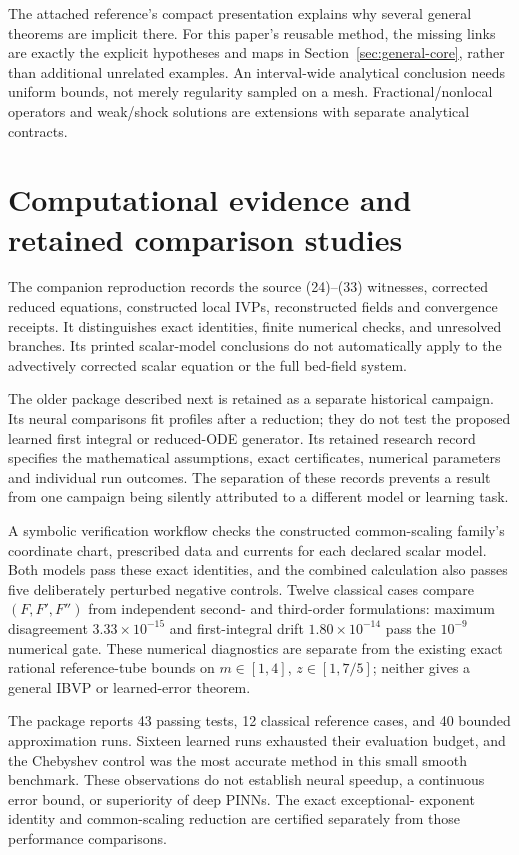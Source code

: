 \documentclass[11pt]{article}
\theoremstyle{definition}
\begin{document}
The attached reference's compact presentation explains why several general
theorems are implicit there. For this paper's reusable method, the missing
links are exactly the explicit hypotheses and maps in
Section~\ref{sec:general-core}, rather than additional unrelated examples.
An interval-wide analytical conclusion needs uniform bounds, not merely
regularity sampled on a mesh. Fractional/nonlocal operators and weak/shock
solutions are extensions with separate analytical contracts.

\section{Computational evidence and retained comparison studies}
\label{sec:experiment-artifact}
The companion reproduction records the source
(24)--(33) witnesses, corrected reduced equations, constructed local IVPs,
reconstructed fields and convergence receipts. It distinguishes exact
identities, finite numerical checks, and unresolved branches. Its printed
scalar-model conclusions do not automatically apply to the advectively
corrected scalar equation or the full bed-field system.

The older package described next is retained as a separate historical
campaign. Its neural comparisons fit profiles after a reduction; they do not
test the proposed learned first integral or reduced-ODE generator.
Its retained research record specifies the mathematical assumptions,
exact certificates, numerical parameters and individual run outcomes.
The separation of these records prevents a result from one campaign
being silently attributed to a different model or learning task.

A symbolic verification workflow checks the constructed common-scaling
family's coordinate chart, prescribed data and currents for each declared
scalar model. Both models pass these exact identities, and the combined
calculation also passes five deliberately perturbed negative controls.
Twelve classical cases compare $(F,F',F'')$ from independent second- and
third-order formulations: maximum disagreement $3.33\times10^{-15}$ and
first-integral drift $1.80\times10^{-14}$ pass the $10^{-9}$ numerical gate.
These numerical diagnostics are separate from the existing exact rational
reference-tube bounds on $m\in[1,4]$, $z\in[1,7/5]$; neither gives a
general IBVP or learned-error theorem.

The package reports 43 passing tests, 12 classical reference cases, and 40
bounded approximation runs. Sixteen learned runs exhausted their evaluation
budget, and the Chebyshev control was the most accurate method in this small
smooth benchmark. These observations do not establish neural speedup, a
continuous error bound, or superiority of deep PINNs. The exact exceptional-
exponent identity and common-scaling reduction are certified separately from
those performance comparisons.
\end{document}
